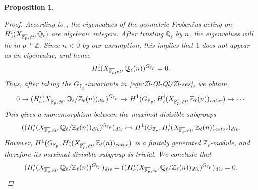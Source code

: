 \documentclass[leqno,12pt]{article}
\theoremstyle{plain}
\newtheorem{proposition}[theorem]{\indent\sc Proposition}
\theoremstyle{definition}
\newcommand{\FF}{\mathbb{F}}
\newcommand{\QQ}{\mathbb{Q}}
\newcommand{\ZZ}{\mathbb{Z}}
\renewcommand{\div}{\text{\it div}}
\newcommand{\cotor}{\text{\it cotor}}
\begin{document}
\begin{proposition}
\begin{proof}
    According to \cite[Expos\'{e}~XXI, 5.5.3]{SGA7}, the eigenvalues of the
    geometric Frobenius acting on
    $H^i_c (X_{\overline{\FF_p},\text{\it \'{e}t}}, \QQ_\ell)$ are algebraic
    integers. After twisting $\QQ_\ell$ by $n$, the eigenvalues will lie in
    $p^{-n}\,\overline{\ZZ}$. Since $n < 0$ by our assumption, this implies
    that $1$ does not appear as an eigenvalue, and hence
    $$H^i_c (X_{\overline{\FF_p},\text{\it \'{e}t}}, \QQ_\ell (n))^{G_{\FF_p}} = 0.$$
    Thus, after taking the $G_{\FF_p}$-invariants in
    \eqref{eqn:Zl-Ql-Ql/Zl-ses}, we obtain
    \[
      0 \to (H^i_c (X_{\overline{\FF_p},\text{\it \'{e}t}}, \QQ_\ell/\ZZ_\ell (n))_\div)^{G_{\FF_p}} \to
      H^1 (G_{\FF_p}, H^i_c (X_{\overline{\FF_p},\text{\it \'{e}t}}, \ZZ_\ell (n))_\cotor) \to \cdots
    \]
    This gives a monomorphism between the maximal divisible subgroups
    \[ ((H^i_c (X_{\overline{\FF_p},\text{\it \'{e}t}}, \QQ_\ell/\ZZ_\ell (n))_\div)^{G_{\FF_p}})_\div \rightarrowtail
    H^1 (G_{\FF_p}, H^i_c (X_{\overline{\FF_p},\text{\it \'{e}t}}, \ZZ_\ell (n))_\cotor)_\div. \]
    However,
    $H^1 (G_{\FF_p}, H^i_c (X_{\overline{\FF_p},\text{\it \'{e}t}}, \ZZ_\ell (n))_\cotor)$
    is a finitely generated $\ZZ_\ell$-module, and therefore its
    maximal divisible subgroup is trivial. We conclude that
    \[ (H^i_c (X_{\overline{\FF_p},\text{\it \'{e}t}}, \QQ_\ell/\ZZ_\ell (n))^{G_{\FF_p}})_\div =
      ((H^i_c (X_{\overline{\FF_p},\text{\it \'{e}t}}, \QQ_\ell/\ZZ_\ell (n))_\div)^{G_{\FF_p}})_\div = 0. \qedhere \]
  \end{proof}
\end{proposition}
\end{document}
